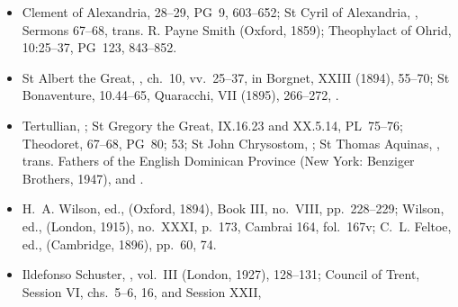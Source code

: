 {\begin{itemize}[itemsep=0em,topsep=0.15em,parsep=0pt]
Akademie-Verlag, 1959), pp.~199--205, especially 34.3 and 34.7--9; St Ambrose,
VII.69--84; St Bede,
 III, Luke 10:23--37, PL~92,
467C--470D.
\item Clement of Alexandria,  28--29, PG~9,
603--652; St Cyril of Alexandria, , Sermons 67--68,
trans. R. Payne Smith (Oxford, 1859); Theophylact of Ohrid,
 10:25--37, PG~123, 843--852.
\item St Albert the Great, , ch.~10, vv.~25--37, in Borgnet,  XXIII (1894),
55--70; St Bonaventure,  10.44--65,
Quaracchi,  VII (1895), 266--272,
.
\item Tertullian, ;
St Gregory the Great,  IX.16.23 and XX.5.14, PL~75--76;
Theodoret,  67--68, PG~80;
 53;
St John Chrysostom,
;
St Thomas Aquinas, , trans. Fathers of the English
Dominican Province (New York: Benziger Brothers, 1947),
and .
\ifdefined\TriptychSynthesisEdition\else
\item H.~A. Wilson, ed., 
(Oxford, 1894), Book III, no.~VIII, pp.~228--229; Wilson, ed.,
(London, 1915), no.~XXXI, p.~173, Cambrai 164, fol.~167v; C.~L. Feltoe, ed.,
(Cambridge, 1896), pp.~60, 74.
\fi
\item Ildefonso Schuster, , vol.~III (London, 1927),
128--131; Council of Trent, Session VI, chs.~5--6, 16, and Session XXII,

\end{itemize}}
